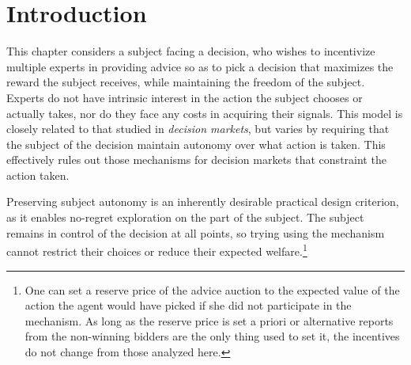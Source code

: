 
\section{Introduction}



This chapter considers a subject facing a decision, who wishes to incentivize multiple experts in providing advice so as to pick a decision that maximizes the reward the subject receives, while maintaining the freedom of the subject.
Experts do not have intrinsic interest in the action the subject chooses or actually takes, nor do they face any costs in acquiring their signals.
This model is closely related to that studied in \emph{decision markets}, but varies by requiring that the subject of the decision maintain autonomy over what action is taken. This effectively rules out those mechanisms for decision markets that constraint the action taken.

Preserving subject autonomy is an inherently desirable practical design criterion, as it enables no-regret exploration on the part of the subject. The subject remains in control of the decision at all points, so trying using the mechanism cannot restrict their choices or reduce their expected welfare.\footnote{One can set a reserve price of the advice auction to the expected value of the action the agent would have picked if she did not participate in the mechanism. As long as the reserve price is set a priori or alternative reports from the non-winning bidders are the only thing used to set it, the incentives do not change from those analyzed here.}



